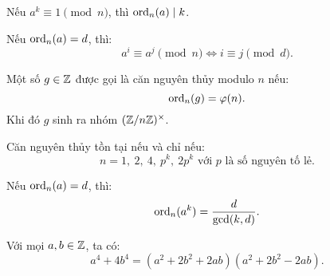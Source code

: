 \documentclass[../imo-training-open-book.tex]{subfiles}
\begin{document}
\vspace{1em}

\begin{theorem*}
    \label{theorem:order-divides-exponent}
    Nếu \( a^k \equiv 1 \pmod{n} \), thì \( \operatorname{ord}_n(a) \mid k \).
\end{theorem*}

\vspace{1em}

\begin{lemma*}
    \label{lemma:order-preserved}
    Nếu \( \operatorname{ord}_n(a) = d \), thì:
    \[
        a^i \equiv a^j \pmod{n} \iff i \equiv j \pmod{d}.
    \]
\end{lemma*}

\vspace{1em}

\begin{definition*}
    \label{definition:primitive-root}
    Một số \( g \in \mathbb Z \) được gọi là căn nguyên thủy modulo \( n \) nếu:
    \[
        \operatorname{ord}_n(g) = \varphi(n).
    \]
    Khi đó \( g \) sinh ra nhóm \( (\mathbb Z/n\mathbb Z)^\times \).
\end{definition*}

\vspace{1em}

\begin{theorem*}
    \label{theorem:existence-primitive-root}
    Căn nguyên thủy tồn tại nếu và chỉ nếu:
    \[
        n = 1,\ 2,\ 4,\ p^k,\ 2p^k \text{ với } p \text{ là số nguyên tố lẻ}.
    \]
\end{theorem*}

\vspace{1em}

\begin{lemma*}
    \label{lemma:order-of-power}
    Nếu \( \operatorname{ord}_n(a) = d \), thì:
    \[
        \operatorname{ord}_n(a^k) = \frac{d}{\gcd(k, d)}.
    \]
\end{lemma*}

\vspace{1em}

\begin{theorem*}
    \label{theorem:sophie-germain-identity}
    Với mọi \( a, b \in \mathbb Z \), ta có:
    \[
        a^4 + 4b^4 = (a^2 + 2b^2 + 2ab)(a^2 + 2b^2 - 2ab).
    \]
\end{theorem*}
\end{document}
